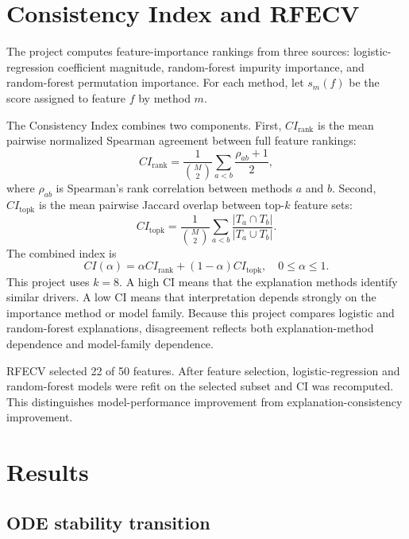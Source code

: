 \documentclass[11pt]{article}
\begin{document}
\section{Consistency Index and RFECV}

The project computes feature-importance rankings from three sources: logistic-regression coefficient magnitude, random-forest impurity importance, and random-forest permutation importance. For each method, let $s_m(f)$ be the score assigned to feature $f$ by method $m$.

The Consistency Index combines two components. First, $CI_{\mathrm{rank}}$ is the mean pairwise normalized Spearman agreement between full feature rankings:
\begin{equation}
CI_{\mathrm{rank}} = \frac{1}{\binom{M}{2}} \sum_{a<b} \frac{\rho_{ab}+1}{2},
\end{equation}
where $\rho_{ab}$ is Spearman's rank correlation between methods $a$ and $b$. Second, $CI_{\mathrm{topk}}$ is the mean pairwise Jaccard overlap between top-$k$ feature sets:
\begin{equation}
CI_{\mathrm{topk}} = \frac{1}{\binom{M}{2}} \sum_{a<b} \frac{|T_a \cap T_b|}{|T_a \cup T_b|}.
\end{equation}
The combined index is
\begin{equation}
CI(\alpha) = \alpha CI_{\mathrm{rank}} + (1-\alpha)CI_{\mathrm{topk}}, \quad 0\leq \alpha \leq 1.
\end{equation}
This project uses $k=8$. A high CI means that the explanation methods identify similar drivers. A low CI means that interpretation depends strongly on the importance method or model family. Because this project compares logistic and random-forest explanations, disagreement reflects both explanation-method dependence and model-family dependence.

RFECV selected 22 of 50 features. After feature selection, logistic-regression and random-forest models were refit on the selected subset and CI was recomputed. This distinguishes model-performance improvement from explanation-consistency improvement.

\section{Results}

\subsection{ODE stability transition}
\end{document}
